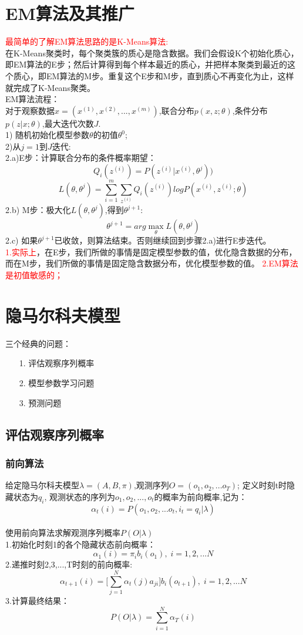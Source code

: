 \documentclass[UTF8]{article}%
\begin{document}
	\section{EM算法及其推广}
	\textcolor{red}{最简单的了解EM算法思路的是K-Means算法:}
	\\在K-Means聚类时，每个聚类簇的质心是隐含数据。我们会假设K个初始化质心，即EM算法的E步；然后计算得到每个样本最近的质心，并把样本聚类到最近的这个质心，即EM算法的M步。重复这个E步和M步，直到质心不再变化为止，这样就完成了K-Means聚类。
	\\EM算法流程：
	\\对于观察数据$x=(x^{(1)},x^{(2)},...,x^{(m)})$,联合分布$p(x,z;\theta)$,条件分布$p(z|x;\theta)$,最大迭代次数$J$.
	\\1) 随机初始化模型参数$\theta$的初值$\theta^0$;
	\\2)从$j=1$到$J$迭代:
	\\2.a)E步：计算联合分布的条件概率期望：$$Q_i(z^{(i)}) = P( z^{(i)}|x^{(i)},\theta^{j}))$$
	$$L(\theta, \theta^{j}) = \sum\limits_{i=1}^m\sum\limits_{z^{(i)}}Q_i(z^{(i)})log{P(x^{(i)}, z^{(i)};\theta)}$$
	2.b) M步：极大化$L(\theta, \theta^{j})$,得到$ \theta^{j+1}$:
	$$\theta^{j+1} = arg \max \limits_{\theta}L(\theta, \theta^{j})$$
	2.c) 如果$ \theta^{j+1}$已收敛，则算法结束。否则继续回到步骤2.a)进行E步迭代。
	\\	\textcolor{red}{1.实际上}，在E步，我们所做的事情是固定模型参数的值，优化隐含数据的分布，而在M步，我们所做的事情是固定隐含数据分布，优化模型参数的值。
	\textcolor{red}{2.EM算法是初值敏感的；}
	
	\section{隐马尔科夫模型}
	
	三个经典的问题：
	\begin{enumerate}		
		\item[1.]评估观察序列概率
		\item[2.]模型参数学习问题
		\item[3.]预测问题
	\end{enumerate}

	\subsection{评估观察序列概率}
	
	\subsubsection{前向算法}
	给定隐马尔科夫模型$\lambda = (A,B,\pi)$,观测序列$O=(o_1,o_2,...o_T)$;
	定义时刻t时隐藏状态为$q_i$, 观测状态的序列为$o_1,o_2,...,o_t$的概率为前向概率,记为：
	$$\alpha_t(i) = P(o_1,o_2,...o_t, i_t =q_i | \lambda)$$
	\\使用前向算法求解观测序列概率$P(O|\lambda)$
	\\1.初始化时刻1的各个隐藏状态前向概率：$$\alpha_1(i) = \pi_ib_i(o_1),\; i=1,2,...N$$
	2.递推时刻2,3,...,T时刻的前向概率:$$\alpha_{t+1}(i) = \Big[\sum\limits_{j=1}^N\alpha_t(j)a_{ji}\Big]b_i(o_{t+1}),\; i=1,2,...N$$
	3.计算最终结果：$$P(O|\lambda) = \sum\limits_{i=1}^N\alpha_T(i)$$
	
\end{document}
